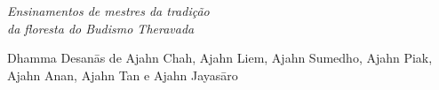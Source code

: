 
\cleartorecto
\thispagestyle{empty}
\vspace*{5em}
\newlength\titleLength
\newlength\xheight

{\centering

\settowidth{\titleLength}{%
  {\Large\chapterTitleFont\scshape\MakeLowercase{\thetitle}}%
}

{\Large\chapterTitleFont\scshape\MakeLowercase{\thetitle}}\\[0.3\baselineskip]
\raisebox{0.5\xheight}{\color[gray]{0.4}\rule{\titleLength}{0.1pt}}\\[0.3\baselineskip]
{\itshape
Ensinamentos de mestres da tradição\\
da floresta do Budismo Theravada}

\vfill

Dhamma Desanās de Ajahn Chah, Ajahn Liem, Ajahn Sumedho, Ajahn Piak,
Ajahn Anan, Ajahn Tan e Ajahn Jayasāro

\vspace*{5em}

}


